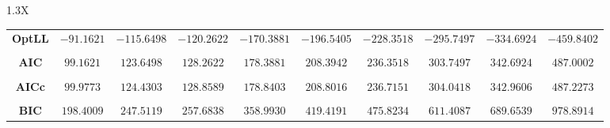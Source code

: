 \documentclass[10pt]{article}
\begin{document}
{\begin{tabularx}{1.3\textwidth}{X}
{\begin{tabular}{cccccccccc}
\cmidrule(r){1-10} \\
 { {\bf OptLL} }& $-91.1621$ & $-115.6498$ & $-120.2622$ & $-170.3881$ & $-196.5405$ & $-228.3518$ & $-295.7497$& $-334.6924$& $-459.8402$ \\
\cmidrule(r){1-10} \\
 { {\bf AIC} }& $99.1621$ & $123.6498$ & $128.2622$ & $178.3881$ & $208.3942$ & $236.3518$ & $303.7497$& $342.6924$& $487.0002$ \\
\cmidrule(r){1-10} \\
 { {\bf AICc} }& $99.9773$ & $124.4303$ & $128.8589$ & $178.8403$ & $208.8016$ & $236.7151$ & $304.0418$& $342.9606$& $487.2273$ \\
\cmidrule(r){1-10} \\
 { {\bf BIC} }& $198.4009$ & $247.5119$ & $257.6838$ & $358.9930$ & $419.4191$ & $475.8234$ & $611.4087$& $689.6539$& $978.8914$ \\
\bottomrule
\end{tabular}}
\end{tabularx}}

  \vspace{3 cm}

  
\end{document}
